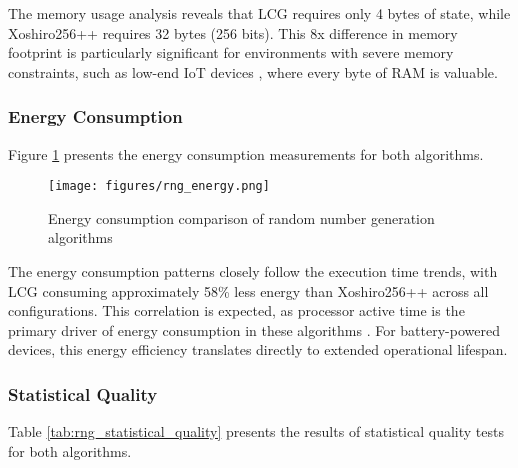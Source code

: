The memory usage analysis reveals that LCG requires only 4 bytes of state, while Xoshiro256++ requires 32 bytes (256 bits). This 8x difference in memory footprint is particularly significant for environments with severe memory constraints, such as low-end IoT devices \cite{iot_survey}, where every byte of RAM is valuable.

\subsubsection{Energy Consumption}
Figure \ref{fig:rng_energy} presents the energy consumption measurements for both algorithms.

\begin{figure}[h]
\centering
\texttt{[image: figures/rng\_energy.png]}
\caption{Energy consumption comparison of random number generation algorithms}
\label{fig:rng_energy}
\end{figure}

The energy consumption patterns closely follow the execution time trends, with LCG consuming approximately 58\% less energy than Xoshiro256++ across all configurations. This correlation is expected, as processor active time is the primary driver of energy consumption in these algorithms \cite{energy_efficient}. For battery-powered devices, this energy efficiency translates directly to extended operational lifespan.

\subsubsection{Statistical Quality}
Table \ref{tab:rng_statistical_quality} presents the results of statistical quality tests for both algorithms.

